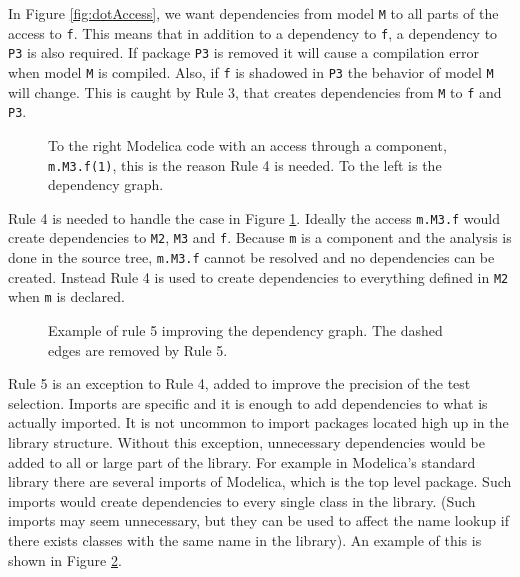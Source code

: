 \documentclass{cslthse-msc}
\begin{document}
In Figure \ref{fig:dotAccess}, we want dependencies from model \texttt{M} to all parts of the access to \texttt{f}. This means that in addition to a dependency to \texttt{f}, a dependency to \texttt{P3} is also required. If package \texttt{P3} is removed it will cause a compilation error when model \texttt{M} is compiled. Also, if \texttt{f} is shadowed in \texttt{P3} the behavior of model \texttt{M} will change. This is caught by Rule 3, that creates dependencies from \texttt{M} to \texttt{f} and \texttt{P3}.


\begin{figure}[!htbp]
    \centering
    \qquad
    \subfloat{\raisebox{4.7 cm}{}}
    \caption{To the right Modelica code with an access through a component, \texttt{m.M3.f(1)}, this is the reason Rule 4 is needed. To the left is the dependency graph.}
    \label{fig:component}
\end{figure}

Rule 4 is needed to handle the case in Figure \ref{fig:component}. Ideally the access \texttt{m.M3.f} would create dependencies to \texttt{M2}, \texttt{M3} and \texttt{f}. Because \texttt{m} is a component and the analysis is done in the source tree, \texttt{m.M3.f} cannot be resolved and no dependencies can be created. Instead Rule 4 is used to create dependencies to everything defined in \texttt{M2} when \texttt{m} is declared.

\begin{figure}[!htbp]
    \centering
    \qquad
    \subfloat{\raisebox{4.0 cm}{}}
    \caption{Example of rule 5 improving the dependency graph. The dashed edges are removed by Rule 5.}
    \label{fig:rule5}
\end{figure}

Rule 5 is an exception to Rule 4, added to improve the precision of the test selection. Imports are specific and it is enough to add dependencies to what is actually imported. It is not uncommon to import packages located high up in the library structure. Without this exception, unnecessary dependencies would be added to all or large part of the library. For example in Modelica's standard library there are several imports of Modelica, which is the top level package. Such imports would create dependencies to every single class in the library. (Such imports may seem unnecessary, but they can be used to affect the name lookup if there exists classes with the same name in the library). An example of this is shown in Figure \ref{fig:rule5}.
\end{document}
